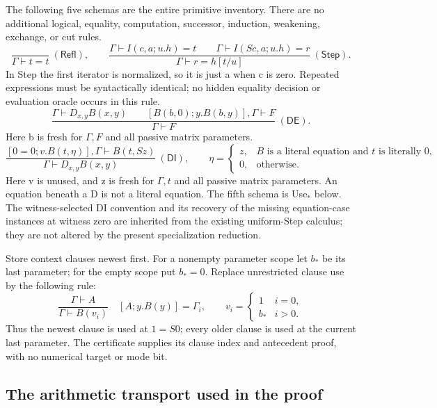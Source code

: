\documentclass[11pt,letterpaper]{article}
\theoremstyle{definition}
\begin{document}
The following five schemas are the entire primitive inventory.  There
are no additional logical, equality, computation, successor, induction,
weakening, exchange, or cut rules.
\[
 \frac{}{\Gamma\vdash t=t}\ (\mathsf{Refl}),\qquad
 \frac{\Gamma\vdash I(c,a;u.h)=t\qquad
       \Gamma\vdash I(Sc,a;u.h)=r}
      {\Gamma\vdash r=h[t/u]}\ (\mathsf{Step}).
\]
In Step the first iterator is normalized, so it is just a when c is zero.
Repeated expressions must be syntactically identical; no hidden equality
decision or evaluation oracle occurs in this rule.
\[
 \frac{\Gamma\vdash D_{x,y}B(x,y)\qquad
       [B(b,0);y.B(b,y)],\Gamma\vdash F}
      {\Gamma\vdash F}\ (\mathsf{DE}).
\]
Here b is fresh for \(\Gamma,F\) and all passive matrix parameters.
\[
 \frac{[0=0;v.B(t,\eta)],\Gamma\vdash B(t,Sz)}
      {\Gamma\vdash D_{x,y}B(x,y)}\ (\mathsf{DI}),\qquad
 \eta=\begin{cases}
 z,&B\text{ is a literal equation and }t\text{ is literally }0,\\
 0,&\text{otherwise}.
 \end{cases}
\]
Here v is unused, and z is fresh for \(\Gamma,t\) and all passive matrix
parameters.  An equation beneath a D is not a literal equation.  The
fifth schema is Use$_*$ below.  The witness-selected DI convention and
its recovery of the missing equation-case instances at witness zero are
inherited from the existing uniform-Step calculus; they are not altered
by the present specialization reduction.

Store context
clauses newest first.  For a nonempty parameter scope let \(b_*\) be its
last parameter; for the empty scope put \(b_*=0\).  Replace unrestricted
clause use by the following rule:
\[
 \frac{\Gamma\vdash A}{\Gamma\vdash B(v_i)}
 \quad [A;y.B(y)]=\Gamma_i,
 \qquad v_i=\begin{cases}1&i=0,\\ b_*&i>0.\end{cases}
 \tag{Use$_*$}
\]
Thus the newest clause is used at \(1=S0\); every older clause is used
at the current last parameter.  The certificate supplies its clause
index and antecedent proof, with no numerical target or mode bit.

\subsection{The arithmetic transport used in the proof}
\end{document}
